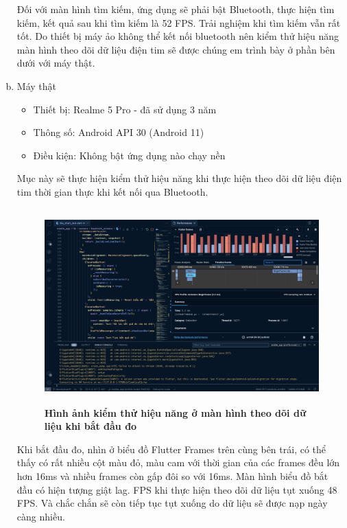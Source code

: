 \begin{enumerate}[a)]
    Đối với màn hình tìm kiếm, ứng dụng sẽ phải bật Bluetooth, thực hiện tìm kiếm, kết quả sau khi tìm kiếm là 52 FPS. Trải nghiệm
    khi tìm kiếm vẫn rất tốt. Do thiết bị máy ảo không thể kết nối bluetooth nên kiểm thử hiệu năng màn hình theo dõi dữ liệu điện tim sẽ được
    chúng em trình bày ở phần bên dưới với máy thật.
  
  \item Máy thật
  \begin{itemize}
    \item Thiết bị: Realme 5 Pro - đã sử dụng 3 năm
    \item Thông số: Android API 30 (Android 11)
    \item Điều kiện: Không bật ứng dụng nào chạy nền
  \end{itemize}

  Mục này sẽ thực hiện kiểm thử hiệu năng khi thực hiện theo dõi dữ liệu điện tim thời gian thực khi kết nối qua Bluetooth.

  \begin{figure}[H]
    \centering
    \includegraphics[width=12cm,height=7.5cm]{Images/mobile_app/demo/measuring_performance.png}
    \caption[Hình ảnh kiểm thử hiệu năng ở màn hình theo dõi dữ liệu khi bắt đầu đo]{\bfseries \fontsize{12pt}{0pt}
    \selectfont Hình ảnh kiểm thử hiệu năng ở màn hình theo dõi dữ liệu khi bắt đầu đo}
    \label{measuring_performance}
  \end{figure}

  Khi bắt đầu đo, nhìn ở biểu đồ Flutter Frames trên cùng bên trái, có thể thấy có rất nhiều cột màu đỏ, màu cam với thời gian
  của các frames đều lớn hơn 16ms và nhiều frames còn gấp đôi so với 16ms. Màn hình biểu đồ bắt đầu có hiện tượng giật lag.
  FPS khi thực hiện theo dõi dữ liệu tụt xuống 48 FPS. Và chắc chắn sẽ còn tiếp tục tụt xuống do dữ liệu sẽ được nạp ngày càng nhiều.


\end{enumerate}
